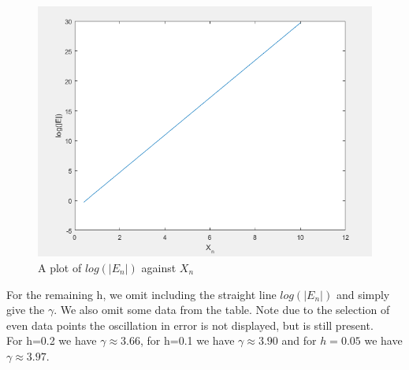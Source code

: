 \documentclass[10pt,a4paper]{report}
\begin{document}
\hspace{0.5cm}
\begin{minipage}[b]{0.45\linewidth}
\begin{figure}[H]
\centering
\includegraphics[width=\textwidth]{q1n25}
\caption{A plot of $log(|E_n|)$ against $X_n$}
\end{figure}
\vspace{2.5cm}
\end{minipage}

\vspace{0.5cm}
For the remaining h, we omit including the straight line $log(|E_n|)$ and simply give the $\gamma$. We also omit some data from the table. Note due to the selection of  even data points the oscillation in error is not displayed, but is still present.\\

For h=0.2 we have $\gamma\approx 3.66$, for h=0.1 we have $\gamma\approx 3.90$ and for $h=0.05$ we have $\gamma\approx3.97$.
\end{document}
